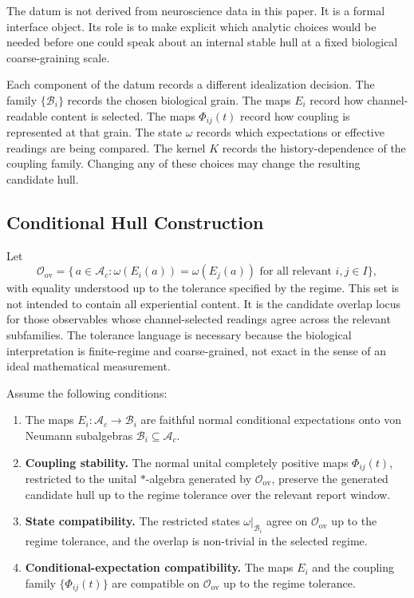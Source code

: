\documentclass[12pt]{article}
\theoremstyle{definition}
\theoremstyle{remark}
\newcommand{\Ac}{\mathcal A_c}
\begin{document}
The datum is not derived from neuroscience data in this paper. It is a
formal interface object. Its role is to make explicit which analytic
choices would be needed before one could speak about an internal stable
hull at a fixed biological coarse-graining scale.

Each component of the datum records a different idealization decision.
The family \(\{\mathcal B_i\}\) records the chosen biological grain. The
maps \(E_i\) record how channel-readable content is selected. The maps
\(\Phi_{ij}(t)\) record how coupling is represented at that grain. The
state \(\omega\) records which expectations or effective readings are
being compared. The kernel \(K\) records the history-dependence of the
coupling family. Changing any of these choices may change the resulting
candidate hull.

\subsection{Conditional Hull Construction}

Let
\[
\mathcal O_{\mathrm{ov}}
=
\bigl\{\,a\in\Ac :
\omega(E_i(a))=\omega(E_j(a))
\text{ for all relevant }i,j\in I
\bigr\},
\]
with equality understood up to the tolerance specified by the regime.
This set is not intended to contain all experiential content. It is the
candidate overlap locus for those observables whose channel-selected
readings agree across the relevant subfamilies. The tolerance language
is necessary because the biological interpretation is finite-regime and
coarse-grained, not exact in the sense of an ideal mathematical
measurement.

Assume the following conditions:
\begin{enumerate}[label=(H\arabic*)]
\item[(H0)] The maps \(E_i:\Ac\to\mathcal B_i\) are faithful normal
conditional expectations onto von Neumann subalgebras
\(\mathcal B_i\subseteq\Ac\).
\item \textbf{Coupling stability.} The normal unital completely positive
maps \(\Phi_{ij}(t)\), restricted to the unital \(*\)-algebra generated
by \(\mathcal O_{\mathrm{ov}}\), preserve the generated candidate hull
up to the regime tolerance over the relevant report window.
\item \textbf{State compatibility.} The restricted states
\(\omega|_{\mathcal B_i}\) agree on \(\mathcal O_{\mathrm{ov}}\) up to
the regime tolerance, and the overlap is non-trivial in the selected
regime.
\item \textbf{Conditional-expectation compatibility.} The maps \(E_i\)
and the coupling family \(\{\Phi_{ij}(t)\}\) are compatible on
\(\mathcal O_{\mathrm{ov}}\) up to the regime tolerance.
\end{enumerate}
\end{document}
